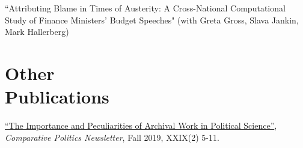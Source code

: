 \documentclass[margin,line,10.95pt]{res}
\begin{document}
\begin{resume}
\vspace*{-3.5mm}
``Attributing Blame in Times of Austerity: A Cross-National Computational Study of Finance Ministers' Budget Speeches" (with Greta Gross, Slava Jankin, Mark Hallerberg)













\section{\sc Other \\ Publications}

\href{https://www.comparativepoliticsnewsletter.org/wp-content/uploads/2019/12/CP-Newsletter-Fall-19-CP-and-History.pdf}{``The Importance and Peculiarities of Archival Work in Political Science''}, \emph{Comparative Politics Newsletter}, Fall 2019, XXIX(2) 5-11.




\end{resume}
\end{document}
